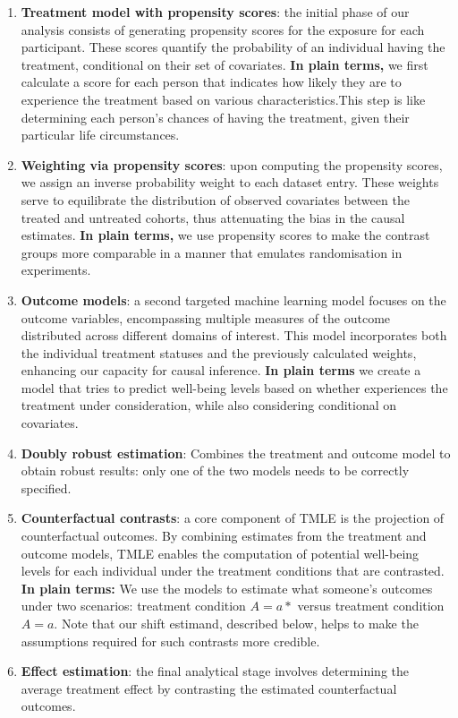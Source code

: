 \documentclass[
  singlecolumn]{article}
\begin{document}
\begin{enumerate}
\def\labelenumi{\arabic{enumi}.}
\item
  \textbf{Treatment model with propensity scores}: the initial phase of
  our analysis consists of generating propensity scores for the exposure
  for each participant. These scores quantify the probability of an
  individual having the treatment, conditional on their set of
  covariates. \textbf{In plain terms,} we first calculate a score for
  each person that indicates how likely they are to experience the
  treatment based on various characteristics.This step is like
  determining each person's chances of having the treatment, given their
  particular life circumstances.
\item
  \textbf{Weighting via propensity scores}: upon computing the
  propensity scores, we assign an inverse probability weight to each
  dataset entry. These weights serve to equilibrate the distribution of
  observed covariates between the treated and untreated cohorts, thus
  attenuating the bias in the causal estimates. \textbf{In plain terms,}
  we use propensity scores to make the contrast groups more comparable
  in a manner that emulates randomisation in experiments.
\item
  \textbf{Outcome models}: a second targeted machine learning model
  focuses on the outcome variables, encompassing multiple measures of
  the outcome distributed across different domains of interest. This
  model incorporates both the individual treatment statuses and the
  previously calculated weights, enhancing our capacity for causal
  inference. \textbf{In plain terms} we create a model that tries to
  predict well-being levels based on whether experiences the treatment
  under consideration, while also considering conditional on covariates.
\item
  \textbf{Doubly robust estimation}: Combines the treatment and outcome
  model to obtain robust results: only one of the two models needs to be
  correctly specified.
\item
  \textbf{Counterfactual contrasts}: a core component of TMLE is the
  projection of counterfactual outcomes. By combining estimates from the
  treatment and outcome models, TMLE enables the computation of
  potential well-being levels for each individual under the treatment
  conditions that are contrasted. \textbf{In plain terms:} We use the
  models to estimate what someone's outcomes under two scenarios:
  treatment condition \(A=a*\) versus treatment condition \(A = a\).
  Note that our shift estimand, described below, helps to make the
  assumptions required for such contrasts more credible.
\item
  \textbf{Effect estimation}: the final analytical stage involves
  determining the average treatment effect by contrasting the estimated
  counterfactual outcomes.
\end{enumerate}
\end{document}
